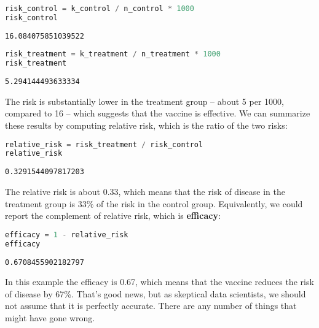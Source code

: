 \begin{lstlisting}[language=Python,style=source]
risk_control = k_control / n_control * 1000
risk_control
\end{lstlisting}

\begin{lstlisting}[style=output]
16.084075851039522
\end{lstlisting}

\begin{lstlisting}[language=Python,style=source]
risk_treatment = k_treatment / n_treatment * 1000
risk_treatment
\end{lstlisting}

\begin{lstlisting}[style=output]
5.294144493633334
\end{lstlisting}

The risk is substantially lower in the treatment group -- about 5 per
1000, compared to 16 -- which suggests that the vaccine is effective. We
can summarize these results by computing relative risk, which is the
ratio of the two risks:

\begin{lstlisting}[language=Python,style=source]
relative_risk = risk_treatment / risk_control
relative_risk
\end{lstlisting}

\begin{lstlisting}[style=output]
0.3291544097817203
\end{lstlisting}

The relative risk is about 0.33, which means that the risk of disease in
the treatment group is 33\% of the risk in the control group.
Equivalently, we could report the complement of relative risk, which is
\textbf{efficacy}:

\begin{lstlisting}[language=Python,style=source]
efficacy = 1 - relative_risk
efficacy
\end{lstlisting}

\begin{lstlisting}[style=output]
0.6708455902182797
\end{lstlisting}

In this example the efficacy is 0.67, which means that the vaccine
reduces the risk of disease by 67\%. That's good news, but as skeptical
data scientists, we should not assume that it is perfectly accurate.
There are any number of things that might have gone wrong.

